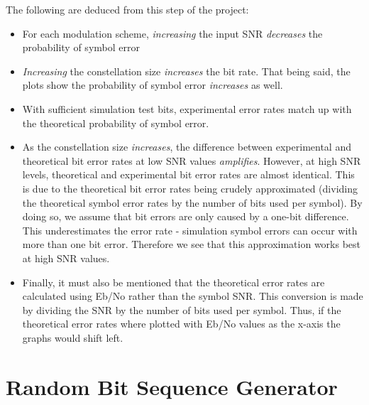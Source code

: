 \documentclass[]{article}
\begin{document}
The following are deduced from this step of the project:
\begin{itemize}
\item For each modulation scheme, \emph{increasing} the input SNR \emph{decreases} the probability of symbol error
\item \emph{Increasing} the constellation size \emph{increases} the bit rate.  That being said, the plots show the probability of symbol error \emph{increases} as well.
\item With sufficient simulation test bits, experimental error rates match up with  the theoretical probability of symbol error. 
\item As the constellation size \emph{increases}, the difference between experimental and theoretical bit error rates at low SNR values \emph{amplifies}. However, at high SNR levels, theoretical and experimental bit error rates are almost identical. This is due to the theoretical bit error rates being crudely approximated (dividing the theoretical symbol error rates by the number of bits used per symbol). By doing so, we assume that bit errors are only caused by a one-bit difference.  This underestimates the error rate - simulation symbol errors can occur with more than one bit error. Therefore we see that this approximation works best at high SNR values. 
\item Finally, it must also be mentioned that the theoretical error rates are calculated using Eb/No rather than the symbol SNR. This conversion is made by dividing the SNR by the number of bits used per symbol. Thus, if the theoretical error rates where plotted with Eb/No values as the x-axis the graphs would shift left.  

\end{itemize}

\appendix
\newpage
%


\section{Random Bit Sequence Generator}
\label{app:random_bit_generator}

\end{document}
